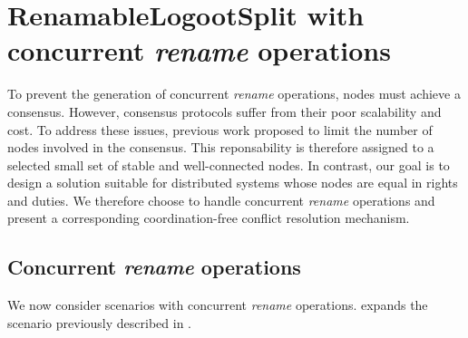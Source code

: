 \documentclass[10pt,journal,compsoc]{IEEEtran}
\begin{document}
\section{RenamableLogootSplit with concurrent \emph{rename} operations}

\label{sec:distributed-rls}

To prevent the generation of concurrent \emph{rename} operations, nodes must achieve a consensus.
However, consensus protocols suffer from their poor scalability and cost.
To address these issues, previous work\cite{letia:hal-01248270,zawirski:hal-01248197} proposed to limit the number of nodes involved in the consensus.
This reponsability is therefore assigned to a selected small set of stable and well-connected nodes.
In contrast, our goal is to design a solution suitable for distributed systems whose nodes are equal in rights and duties.
We therefore choose to handle concurrent \emph{rename} operations and present a corresponding coordination-free conflict resolution mechanism.

\subsection{Concurrent \emph{rename} operations}

We now consider scenarios with concurrent \emph{rename} operations.
 expands the scenario previously described in .
\end{document}
